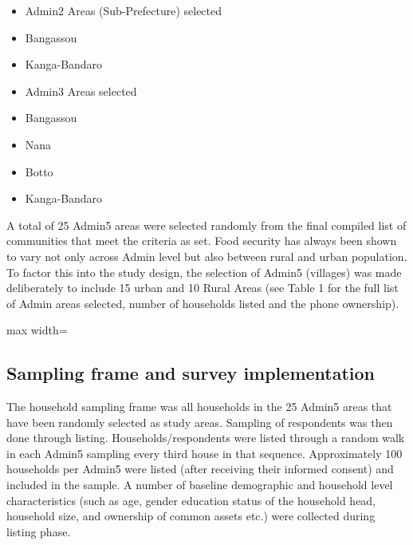\documentclass[11pt,harvard]{article}
\begin{document}
	\begin{itemize} [label=--, left=1.5em]
		\item Admin2 Areas (Sub-Prefecture) selected
			\item[1.] Bangassou
			\item[2.] Kanga-Bandaro
	\end{itemize}
	
	\begin{itemize}[label=--, left=1.5em]
		\item Admin3 Areas selected
			\item[1.] Bangassou
			\item[2.] Nana
			\item[3.] Botto
			\item[4.] Kanga-Bandaro 
	\end{itemize}
	
A total of 25 Admin5 areas were selected randomly from the final compiled list of communities that meet the criteria as set. Food security has always been shown to vary not only across Admin level but also between rural and urban population. To factor this into the study design, the selection of Admin5 (villages) was made deliberately to include 15 urban and 10 Rural Areas (see Table 1 for the full list of Admin areas selected, number of households listed and the phone ownership).
	
	\begin{table}[htbp]
		\centering
		\begin{adjustbox}{max width=\textwidth}
			\begin{threeparttable}
				\caption{Listed Sample: ADMIN Area Selection and Distribution of Phone Ownership}
				\scriptsize
				 
				\label{tab:}
			\end{threeparttable}
		\end{adjustbox}
	\end{table}
	
	\subsection{Sampling frame and survey implementation}
		
The household sampling frame was all households in the 25 Admin5 areas that have been randomly selected as study areas. Sampling of respondents was then done through listing. Households/respondents were listed through a random walk in each Admin5 sampling every third house in that sequence. Approximately 100 households per Admin5 were listed (after receiving their informed consent) and included in the sample. A number of baseline demographic and household level characteristics (such as age, gender education status of the household head, household size, and ownership of common assets etc.) were collected during listing phase. 
	
\end{document}
